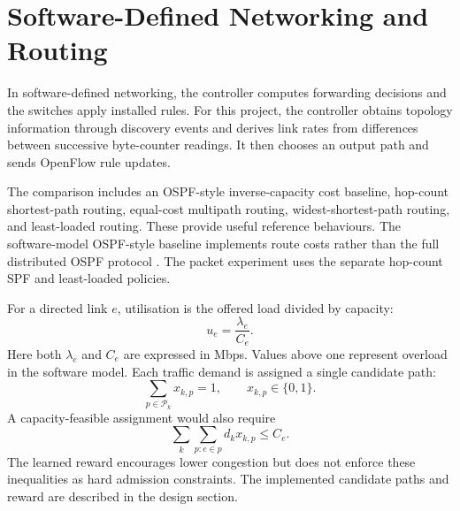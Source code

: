\documentclass[12pt,a4paper,oneside]{report}
\let\cite\citep
\begin{document}
\section{Software-Defined Networking and Routing}
In software-defined networking, the controller computes forwarding decisions and the switches apply installed rules. For this project, the controller obtains topology information through discovery events and derives link rates from differences between successive byte-counter readings. It then chooses an output path and sends OpenFlow rule updates.

The comparison includes an OSPF-style inverse-capacity cost baseline, hop-count shortest-path routing, equal-cost multipath routing, widest-shortest-path routing, and least-loaded routing. These provide useful reference behaviours. The software-model OSPF-style baseline implements route costs rather than the full distributed OSPF protocol \cite{moy1998ospf}. The packet experiment uses the separate hop-count SPF and least-loaded policies.

For a directed link \(e\), utilisation is the offered load divided by capacity:
\begin{equation}
u_e=\frac{\lambda_e}{C_e}.
\end{equation}
Here both \(\lambda_e\) and \(C_e\) are expressed in Mbps. Values above one represent overload in the software model. Each traffic demand is assigned a single candidate path:
\begin{equation}
\label{eq:path_assignment}
\sum_{p\in\mathcal{P}_k}x_{k,p}=1,\qquad x_{k,p}\in\{0,1\}.
\end{equation}
A capacity-feasible assignment would also require
\begin{equation}
\label{eq:capacity_constraint}
\sum_{k}\sum_{p:e\in p}d_kx_{k,p}\le C_e.
\end{equation}
The learned reward encourages lower congestion but does not enforce these inequalities as hard admission constraints. The implemented candidate paths and reward are described in the design section.
\end{document}
